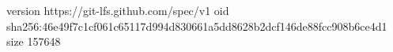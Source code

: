 version https://git-lfs.github.com/spec/v1
oid sha256:46e49f7c1cf061c65117d994d830661a5dd8628b2dcf146de88fcc908b6ce4d1
size 157648
